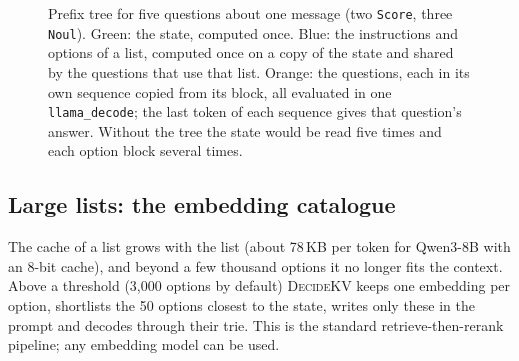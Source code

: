 \documentclass[11pt]{article}
\newcommand{\dkv}{\textsc{DecideKV}}
\begin{document}
\begin{figure}[t]
\centering
{}
\caption{Prefix tree for five questions about one message (two \texttt{Score}, three \texttt{Noul}). Green: the
state, computed once. Blue: the instructions and options of a list, computed once on a copy of the state and shared by
the questions that use that list. Orange: the questions, each in its own sequence copied from its block, all evaluated
in one \texttt{llama\_decode}; the last token of each sequence gives that question's answer. Without the tree the
state would be read five times and each option block several times.}\label{fig:tree}
\end{figure}

\subsection{Large lists: the embedding catalogue}\label{sec:catalogue}
The cache of a list grows with the list (about 78\,KB per token for Qwen3-8B with an 8-bit cache), and beyond a few
thousand options it no longer fits the context. Above a threshold (3{,}000 options by default) \dkv{} keeps one
embedding per option, shortlists the 50 options closest to the state, writes only these in the prompt and decodes
through their trie. This is the standard retrieve-then-rerank pipeline; any embedding model can be used.
\end{document}
